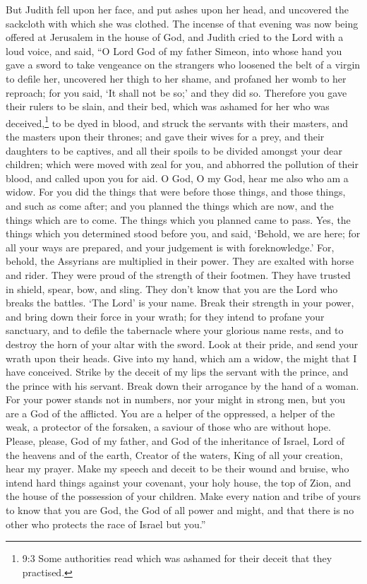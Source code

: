  But Judith fell upon her face, and put ashes upon her head,
and uncovered the sackcloth with which she was clothed. The incense of
that evening was now being offered at Jerusalem in the house of God, and
Judith cried to the Lord with a loud voice, and said,  ``O
Lord God of my father Simeon, into whose hand you gave a sword to take
vengeance on the strangers who loosened the belt of a virgin to defile
her, uncovered her thigh to her shame, and profaned her womb to her
reproach; for you said, `It shall not be so;' and they did so.
 Therefore you gave their rulers to be slain, and their bed,
which was ashamed for her who was deceived,\footnote{9:3 Some
  authorities read which was ashamed for their deceit that they
  practised.} to be dyed in blood, and struck the servants with their
masters, and the masters upon their thrones;  and gave their
wives for a prey, and their daughters to be captives, and all their
spoils to be divided amongst your dear children; which were moved with
zeal for you, and abhorred the pollution of their blood, and called upon
you for aid. O God, O my God, hear me also who am a widow. 
For you did the things that were before those things, and those things,
and such as come after; and you planned the things which are now, and
the things which are to come. The things which you planned came to pass.
 Yes, the things which you determined stood before you, and
said, `Behold, we are here; for all your ways are prepared, and your
judgement is with foreknowledge.'  For, behold, the
Assyrians are multiplied in their power. They are exalted with horse and
rider. They were proud of the strength of their footmen. They have
trusted in shield, spear, bow, and sling. They don't know that you are
the Lord who breaks the battles. `The Lord' is your name. 
Break their strength in your power, and bring down their force in your
wrath; for they intend to profane your sanctuary, and to defile the
tabernacle where your glorious name rests, and to destroy the horn of
your altar with the sword.  Look at their pride, and send
your wrath upon their heads. Give into my hand, which am a widow, the
might that I have conceived.  Strike by the deceit of my
lips the servant with the prince, and the prince with his servant. Break
down their arrogance by the hand of a woman.  For your
power stands not in numbers, nor your might in strong men, but you are a
God of the afflicted. You are a helper of the oppressed, a helper of the
weak, a protector of the forsaken, a saviour of those who are without
hope.  Please, please, God of my father, and God of the
inheritance of Israel, Lord of the heavens and of the earth, Creator of
the waters, King of all your creation, hear my prayer. 
Make my speech and deceit to be their wound and bruise, who intend hard
things against your covenant, your holy house, the top of Zion, and the
house of the possession of your children.  Make every
nation and tribe of yours to know that you are God, the God of all power
and might, and that there is no other who protects the race of Israel
but you.''

